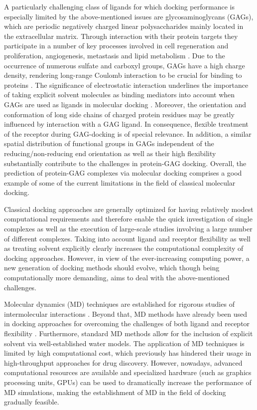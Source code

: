 A particularly challenging class of ligands for which docking
performance is especially limited by the above-mentioned issues are
glycosaminoglycans (GAGs), which are periodic negatively charged linear
polysaccharides mainly located in the extracellular matrix. Through interaction
with their protein targets they participate in a number of key processes
involved in cell regeneration and proliferation, angiogenesis, metastasis and
lipid metabolism \cite{hynes_extracellular_2009, macri_growth_2007,
barbero_chembiochem_2013}. Due to the occurrence of numerous sulfate and
carboxyl groups, GAGs have a high charge density, rendering long-range Coulomb
interaction to be crucial for binding to proteins
\cite{mulloy_specificity_2005}. The significance of electrostatic interaction
underlines the importance of taking explicit solvent molecules as binding
mediators into account when GAGs are used as ligands in molecular docking
\cite{samsonov_docking_2011}. Moreover, the orientation and conformation of long
side chains of charged protein residues may be greatly influenced by interaction
with a GAG ligand. In consequence, flexible treatment of the receptor during
GAG-docking is of special relevance. In addition, a similar spatial distribution
of functional groups in GAGs independent of the reducing/non-reducing end
orientation \cite{hp_binding_sites_mulloy_2006} as well as their high
flexibility \cite{bitomsky_gag_docking_1999} substantially contribute to the
challenges in protein-GAG docking. Overall, the prediction of protein-GAG
complexes via molecular docking comprises a good example of some of the current
limitations in the field of classical molecular docking.

Classical docking approaches are generally optimized for having relatively
modest computational requirements and therefore enable the quick investigation
of single complexes as well as the execution of large-scale studies involving a
large number of different complexes. Taking into account ligand and receptor
flexibility as well as treating solvent explicitly clearly increases the
computational complexity of docking approaches. However, in view of the
ever-increasing computing power, a new generation of docking methods should
evolve, which though being computationally more demanding, aims to deal with the
above-mentioned challenges.

Molecular dynamics (MD) techniques are established for rigorous studies of
intermolecular interactions \cite{karplus_molecular_2005}. Beyond that, MD
methods have already been used in docking approaches for overcoming the
challenges of both ligand and receptor flexibility
\cite{chaudhuri_application_2012, antes_dynadock_2010}. Furthermore, standard MD
methods allow for the inclusion of explicit solvent via well-established water
models. The application of MD techniques is limited by high computational cost,
which previously has hindered their usage in high-throughput approaches for drug
discovery. However, nowadays, advanced computational resources are available and
specialized hardware (such as graphics processing units, GPUs) can be used to
dramatically increase the performance of MD simulations, making the
establishment of MD in the field of docking gradually feasible.

